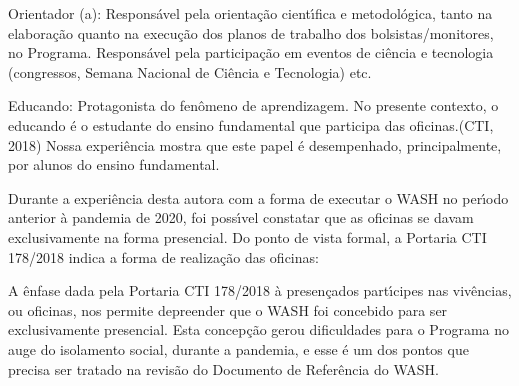 \documentclass[
12pt,		%
openright,	%
twoside,  %
a4paper,			%
chapter=TITLE,		%
english,			%
french,				%
spanish,			%
brazil				%
]{USPSC-classe/USPSC}
\begin{document}
\begin{alineas}
\item Orientador (a): \textquotedbl Respons\'avel pela orienta\c{c}\~ao cient\'{\i}fica e metodol\'ogica, tanto na elabora\c{c}\~ao quanto na execu\c{c}\~ao dos planos de trabalho dos bolsistas/monitores, no Programa. Respons\'avel pela participa\c{c}\~ao em eventos de ci\^encia e tecnologia (congressos, Semana Nacional de Ci\^encia e Tecnologia) etc.
\item Educando: \textquotedbl Protagonista do fen\^omeno de aprendizagem. No presente contexto, o educando \'e o estudante do ensino fundamental que participa das oficinas.\textquotedbl   (CTI, 2018) Nossa experi\^encia mostra que este papel \'e desempenhado, principalmente, por alunos do ensino fundamental.
\end{alineas}

Durante a experi\^encia desta autora com a forma de executar o WASH no per\'{\i}odo anterior \`a pandemia de 2020, foi poss\'{\i}vel constatar que as oficinas se davam exclusivamente na forma presencial. Do ponto de vista formal, a Portaria CTI 178/2018 indica  a forma de realiza\c{c}\~ao das oficinas:


















\noindent\begin{center}\mbox{\centering{}}\end{center}


A \^enfase dada pela Portaria CTI 178/2018 \`a \textquotedbl presen\c{c}a\textquotedbl  dos part\'{\i}cipes nas \textquotedbl viv\^encias\textquotedbl , ou oficinas, nos permite depreender que o WASH foi concebido para ser exclusivamente presencial. Esta concep\c{c}\~ao gerou dificuldades para o Programa no auge do isolamento social, durante a pandemia, e esse \'e um dos pontos que precisa ser tratado na revis\~ao do Documento de Refer\^encia do WASH.
\end{document}
